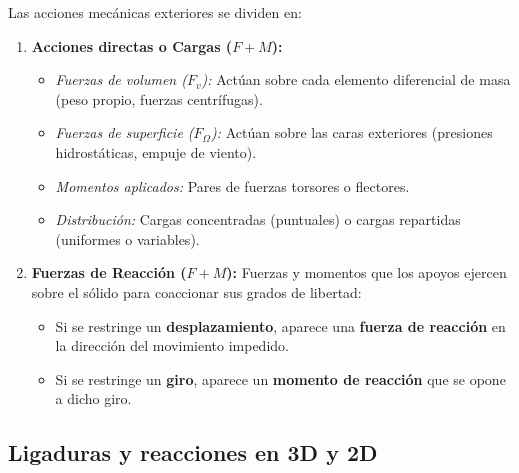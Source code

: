 Las acciones mecánicas exteriores se dividen en:

\begin{enumerate}

    \item \textbf{Acciones directas o Cargas ($F + M$):}

          \begin{itemize}

              \item \textit{Fuerzas de volumen ($F_v$):} Actúan sobre cada elemento diferencial de masa (peso propio, fuerzas centrífugas).

              \item \textit{Fuerzas de superficie ($F_\Omega$):} Actúan sobre las caras exteriores (presiones hidrostáticas, empuje de viento).

              \item \textit{Momentos aplicados:} Pares de fuerzas torsores o flectores.

              \item \textit{Distribución:} Cargas concentradas (puntuales) o cargas repartidas (uniformes o variables).

          \end{itemize}

    \item \textbf{Fuerzas de Reacción ($F + M$):} Fuerzas y momentos que los apoyos ejercen sobre el sólido para coaccionar sus grados de libertad:

          \begin{itemize}

              \item Si se restringe un \textbf{desplazamiento}, aparece una \textbf{fuerza de reacción} en la dirección del movimiento impedido.

              \item Si se restringe un \textbf{giro}, aparece un \textbf{momento de reacción} que se opone a dicho giro.

          \end{itemize}

\end{enumerate}



\subsection{Ligaduras y reacciones en 3D y 2D}

